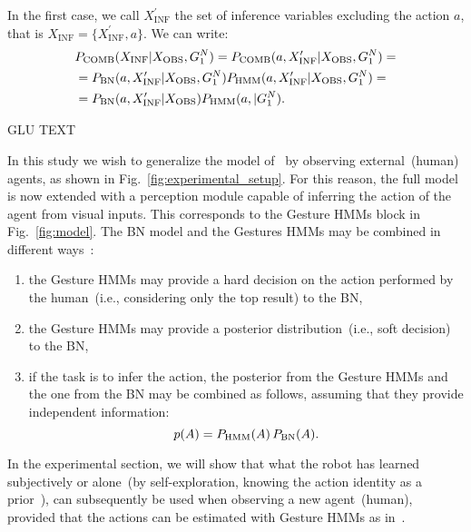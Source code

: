 In the first case, we call $X_\text{INF}^\prime$ the set of inference variables excluding the action $a$, that is $X_\text{INF} = \{X_\text{INF}^\prime, a\}$.
We can write:
\begin{align*}
  & P_{\text{COMB}}(X_\text{INF}| X_\text{OBS}, G_1^N) = P_{\text{COMB}}(a, X_\text{INF}^\prime| X_\text{OBS}, G_1^N)= \\
  &= P_{\text{BN}}(a, X_\text{INF}^\prime| X_\text{OBS}, G_1^N) P_{\text{HMM}}(a, X_\text{INF}^\prime| X_\text{OBS}, G_1^N)= \\
  &= P_{\text{BN}}(a, X_\text{INF}^\prime| X_\text{OBS}) P_{\text{HMM}}(a, | G_1^N).
\end{align*}

GLU TEXT

In this study we wish to generalize the model of~\cite{salvi:2012:smcb} by observing external~(human) agents, as shown in Fig.~\ref{fig:experimental_setup}. For this reason, the full model is now extended with a perception module capable of inferring the action of the agent from visual inputs. This corresponds to the Gesture \acp{HMM} block in Fig.~\ref{fig:model}. The \AffWords{} \acf{BN} model and the Gestures \acp{HMM} may be combined in different ways~\cite{pan:2006:ictai}:
\begin{enumerate}
\item the Gesture \acp{HMM} may provide a hard decision on the action performed by the human~(i.e., considering only the top result) to the \ac{BN},

\item the Gesture \acp{HMM} may provide a posterior distribution~(i.e., soft decision) to the \ac{BN},

\item if the task is to infer the action, the posterior from the Gesture \acp{HMM} and the one from the \ac{BN} may be combined as follows, assuming that they provide independent information:
\begin{equation*}
p(A) = P_{\text{HMM}}(A) \, P_{\text{BN}}(A).
\end{equation*}
\end{enumerate}

In the experimental section, we will show that what the robot has learned subjectively or alone~(by self-exploration, knowing the action identity as a prior~\cite{salvi:2012:smcb}), can subsequently be used when observing a new agent~(human), provided that the actions can be estimated with Gesture \acp{HMM} as in~\cite{saponaro:2013:crhri}.
